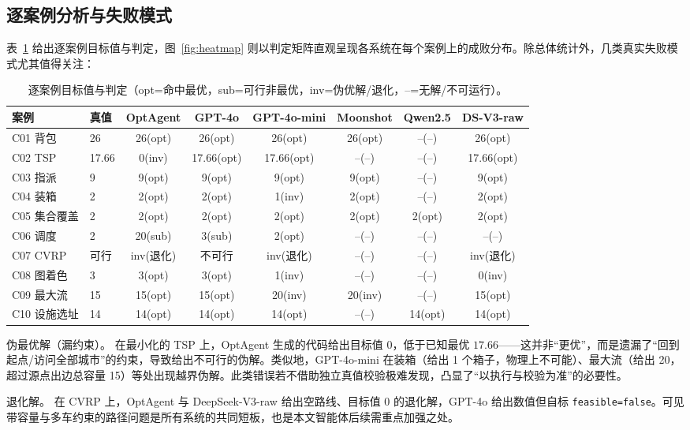 \documentclass[11pt]{article}
\begin{document}
\subsection{逐案例分析与失败模式}\label{sec:percase}
表~\ref{tab:percase} 给出逐案例目标值与判定，图~\ref{fig:heatmap} 则以判定矩阵直观呈现各系统在每个案例上的成败分布。除总体统计外，几类真实失败模式尤其值得关注：

\begin{table}[t]
\centering
\caption{逐案例目标值与判定（opt=命中最优，sub=可行非最优，inv=伪优解/退化，--=无解/不可运行）。}
\label{tab:percase}
\scriptsize
\begin{tabular}{llcccccc}
\toprule
案例 & 真值 & OptAgent & GPT-4o & GPT-4o-mini & Moonshot & Qwen2.5 & DS-V3-raw \\
\midrule
C01 背包 & 26 & 26(opt) & 26(opt) & 26(opt) & 26(opt) & --(--) & 26(opt) \\
C02 TSP & 17.66 & 0(inv) & 17.66(opt) & 17.66(opt) & --(--) & --(--) & 17.66(opt) \\
C03 指派 & 9 & 9(opt) & 9(opt) & 9(opt) & 9(opt) & --(--) & 9(opt) \\
C04 装箱 & 2 & 2(opt) & 2(opt) & 1(inv) & 2(opt) & --(--) & 2(opt) \\
C05 集合覆盖 & 2 & 2(opt) & 2(opt) & 2(opt) & 2(opt) & 2(opt) & 2(opt) \\
C06 调度 & 2 & 20(sub) & 3(sub) & 2(opt) & --(--) & --(--) & --(--) \\
C07 CVRP & 可行 & inv(退化) & 不可行 & inv(退化) & --(--) & --(--) & inv(退化) \\
C08 图着色 & 3 & 3(opt) & 3(opt) & 1(inv) & --(--) & --(--) & 0(inv) \\
C09 最大流 & 15 & 15(opt) & 15(opt) & 20(inv) & 20(inv) & --(--) & 15(opt) \\
C10 设施选址 & 14 & 14(opt) & 14(opt) & 14(opt) & --(--) & 14(opt) & 14(opt) \\
\bottomrule
\end{tabular}
\end{table}

伪最优解（漏约束）。 在最小化的 TSP 上，OptAgent 生成的代码给出目标值 $0$，低于已知最优 $17.66$——这并非“更优”，而是遗漏了“回到起点/访问全部城市”的约束，导致给出不可行的伪解。类似地，GPT-4o-mini 在装箱（给出 1 个箱子，物理上不可能）、最大流（给出 20，超过源点出边总容量 15）等处出现越界伪解。此类错误若不借助独立真值校验极难发现，凸显了“以执行与校验为准”的必要性。

退化解。 在 CVRP 上，OptAgent 与 DeepSeek-V3-raw 给出空路线、目标值 $0$ 的退化解，GPT-4o 给出数值但自标 \texttt{feasible=false}。可见带容量与多车约束的路径问题是所有系统的共同短板，也是本文智能体后续需重点加强之处。
\end{document}
